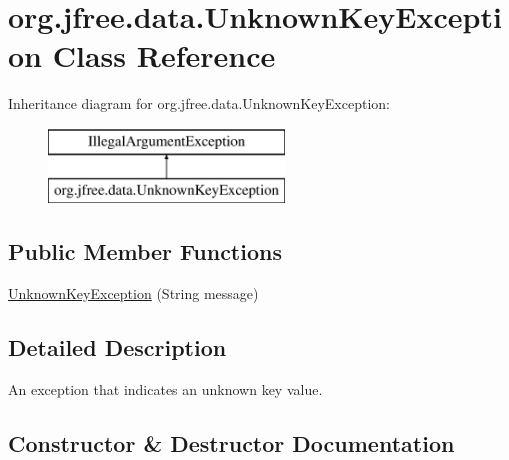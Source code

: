 \hypertarget{classorg_1_1jfree_1_1data_1_1_unknown_key_exception}{}\section{org.\+jfree.\+data.\+Unknown\+Key\+Exception Class Reference}
\label{classorg_1_1jfree_1_1data_1_1_unknown_key_exception}
Inheritance diagram for org.\+jfree.\+data.\+Unknown\+Key\+Exception\+:\begin{figure}[H]
\begin{center}
\leavevmode
\includegraphics[height=2.000000cm]{classorg_1_1jfree_1_1data_1_1_unknown_key_exception}
\end{center}
\end{figure}
\subsection*{Public Member Functions}
\begin{DoxyCompactItemize}
\item 
\mbox{\hyperlink{classorg_1_1jfree_1_1data_1_1_unknown_key_exception_a20a03b3787f8c5dc464ee24bf6f8e775}{Unknown\+Key\+Exception}} (String message)
\end{DoxyCompactItemize}


\subsection{Detailed Description}
An exception that indicates an unknown key value. 

\subsection{Constructor \& Destructor Documentation}
\mbox{\label{classorg_1_1jfree_1_1data_1_1_unknown_key_exception_a20a03b3787f8c5dc464ee24bf6f8e775}} 
